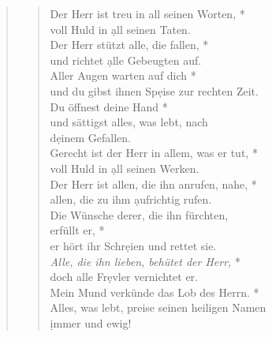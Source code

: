 \vspace{0.3cm}

\def\greinitialformat#1{{\fontsize{40}{40}\selectfont #1}}
\gresetfirstlineaboveinitial{\small \textcolor{red}{Ps 145b}}{}
\setaboveinitialseparation{0.72mm}

\vspace{0.3cm}
\begin{quote}
\begin{verse}
 Der Herr ist treu in all seinen Worten, *\\ voll Huld in \d all seinen Taten.\\
\vin Der Herr stützt alle, die fallen, *\\
\vin und richtet \d alle Gebeugten auf. \\
Aller Augen warten auf dich *\\
und du gibst ihnen Sp\d eise zur rechten Zeit. \\
\vin Du öffnest deine Hand *\\
\vin und sättigst alles, was lebt, nach\\ \vin d\d einem Gefallen. \\
Gerecht ist der Herr in allem, was er tut, *\\
voll Huld in \d all seinen Werken. \\
\vin Der Herr ist allen, die ihn anrufen, nahe, *\\
\vin allen, die zu ihm \d aufrichtig rufen. \\
Die Wünsche derer, die ihn fürchten,\\ erfüllt er, *\\
er hört ihr Schr\d eien und rettet sie. \\
\vin \textit{Alle, die ihn lieben, behütet der Herr,} *\\
\vin doch alle Fr\d evler vernichtet er. \\
Mein Mund verkünde das Lob des Herrn. *\\
Alles, was lebt, preise seinen heiligen Namen \\\d immer und ewig! \\
\end{verse}

 \end{quote}






